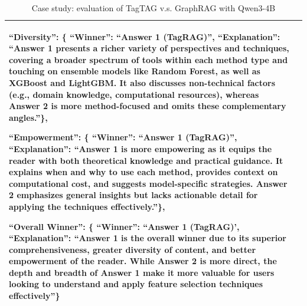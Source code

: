 \documentclass[11pt]{article}
\begin{document}
\begin{table}[h]
\begin{tabularx}{\textwidth}{p{2cm}|X}
    \textbf{``Diversity''}: \{ ``Winner'': ``Answer 1 (TagRAG)'', ``Explanation'': ``Answer 1 presents a richer variety of perspectives and techniques, covering a broader spectrum of tools within each method type and touching on ensemble models like Random Forest, as well as XGBoost and LightGBM. It also discusses non-technical factors (e.g., domain knowledge, computational resources), whereas Answer 2 is more method-focused and omits these complementary angles.''\},
    
    \textbf{``Empowerment''}: \{ ``Winner'': ``Answer 1 (TagRAG)'', ``Explanation'': ``Answer 1 is more empowering as it equips the reader with both theoretical knowledge and practical guidance. It explains when and why to use each method, provides context on computational cost, and suggests model-specific strategies. Answer 2 emphasizes general insights but lacks actionable detail for applying the techniques effectively.''\},
    
    \textbf{``Overall Winner''}: \{ ``Winner'': ``Answer 1 (TagRAG)', ``Explanation'': ``Answer 1 is the overall winner due to its superior comprehensiveness, greater diversity of content, and better empowerment of the reader. While Answer 2 is more direct, the depth and breadth of Answer 1 make it more valuable for users looking to understand and apply feature selection techniques effectively''\} \\

    \bottomrule
\end{tabularx}
\caption{Case study: evaluation of TagTAG v.s. GraphRAG with Qwen3-4B}
\label{tab:TagTAG v.s. GraphRAG}
\end{table}
\end{document}
